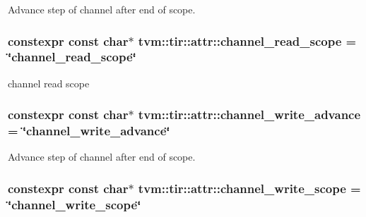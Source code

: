 Advance step of channel after end of scope. 

\subsubsection[{\texorpdfstring{channel\+\_\+read\+\_\+scope}{channel_read_scope}}]{\setlength{\rightskip}{0pt plus 5cm}constexpr const char$\ast$ tvm\+::tir\+::attr\+::channel\+\_\+read\+\_\+scope = \char`\"{}channel\+\_\+read\+\_\+scope\char`\"{}}\hypertarget{namespacetvm_1_1tir_1_1attr_ad39d05bd13aeed7af51e9f8e323d263b}{}\label{namespacetvm_1_1tir_1_1attr_ad39d05bd13aeed7af51e9f8e323d263b}


channel read scope 

\subsubsection[{\texorpdfstring{channel\+\_\+write\+\_\+advance}{channel_write_advance}}]{\setlength{\rightskip}{0pt plus 5cm}constexpr const char$\ast$ tvm\+::tir\+::attr\+::channel\+\_\+write\+\_\+advance = \char`\"{}channel\+\_\+write\+\_\+advance\char`\"{}}\hypertarget{namespacetvm_1_1tir_1_1attr_ad8886f0bca07d9fa56db9edea67b1a8d}{}\label{namespacetvm_1_1tir_1_1attr_ad8886f0bca07d9fa56db9edea67b1a8d}


Advance step of channel after end of scope. 

\subsubsection[{\texorpdfstring{channel\+\_\+write\+\_\+scope}{channel_write_scope}}]{\setlength{\rightskip}{0pt plus 5cm}constexpr const char$\ast$ tvm\+::tir\+::attr\+::channel\+\_\+write\+\_\+scope = \char`\"{}channel\+\_\+write\+\_\+scope\char`\"{}}\hypertarget{namespacetvm_1_1tir_1_1attr_a52f378fc437bd4f7f6508c8e2e9b3e05}{}\label{namespacetvm_1_1tir_1_1attr_a52f378fc437bd4f7f6508c8e2e9b3e05}


